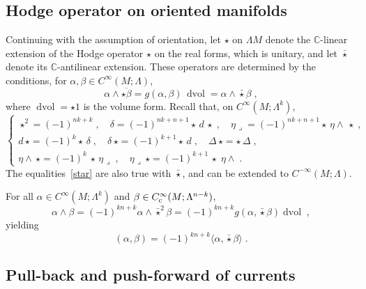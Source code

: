 \documentclass{memo-l}
\theoremstyle{plain}
\theoremstyle{definition}
\theoremstyle{remark}
\newcommand{\C}{\mathbb{C}}
\newcommand{\dvol}{\operatorname{dvol}}
\newcommand{\Cinftyc}{C^\infty_{\text{\rm c}}}
\numberwithin{section}{chapter}
\numberwithin{equation}{section}%
\begin{document}
\subsection{Hodge operator on oriented manifolds}\label{ss: perturbed ops on oriented mfds}

Continuing with the assumption of orientation, let $\star$ on $\Lambda M$ denote the $\C$-linear extension of the Hodge operator $\star$ on the real forms, which is unitary, and let $\bar\star$ denote its $\C$-antilinear extension. These operators are determined by the conditions, for $\alpha,\beta\in C^\infty(M;\Lambda)$, 
\[
\alpha\wedge\overline{\star\beta}=g(\alpha,\beta)\,\dvol=\alpha\wedge\bar\star\beta\;,
\]
where $\dvol=\star1$ is the volume form. Recall that, on $C^\infty(M;\Lambda^k)$, 
\begin{equation}\label{star}
\left\{
\begin{gathered}
\star^2=(-1)^{nk+k}\;,\quad
\delta=(-1)^{nk+n+1}\star\,d\,\star\;,\quad
{\eta\lrcorner}=(-1)^{nk+n+1}\star\,{\eta\wedge}\,\star\;,\\
d\,\star=(-1)^k\star\,\delta\;,\quad
\delta\,\star=(-1)^{k+1}\star\,d\;,\quad
\Delta\,\star=\star\,\Delta\;,\\
{\eta\wedge}\,\star=(-1)^k\,\star\,{\eta\lrcorner}\;,\quad
{\eta\lrcorner}\,\star=(-1)^{k+1}\,\star\;{\eta\wedge}\;.
\end{gathered}
\right.
\end{equation}
The equalities~\eqref{star} are also true with $\bar\star$, and can be extended to $C^{-\infty}(M;\Lambda)$.


For all $\alpha\in C^\infty(M;\Lambda^k)$ and $\beta\in\Cinftyc(M;\Lambda^{n-k})$,
\[
\alpha\wedge\beta=(-1)^{kn+k}\alpha\wedge\bar\star^2\beta=(-1)^{kn+k}g(\alpha,\bar\star\beta)\dvol\;,
\]
yielding
\begin{equation}\label{(alpha beta) = (-1)^rn+r langle alpha star beta rangle}
(\alpha,\beta)=(-1)^{kn+k}\langle\alpha,\bar\star\beta\rangle\;.
\end{equation}



\subsection{Pull-back and push-forward of currents}
\label{ss: pull-back and push-forward of currents}
\end{document}
